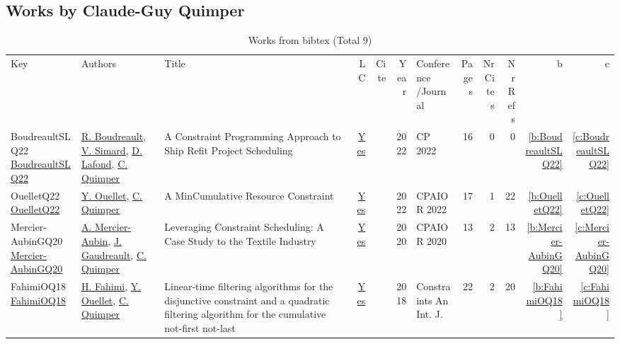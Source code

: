 \subsection{Works by Claude{-}Guy Quimper}
\label{sec:a37}
{\scriptsize
\begin{longtable}{>{\raggedright\arraybackslash}p{3cm}>{\raggedright\arraybackslash}p{6cm}>{\raggedright\arraybackslash}p{6.5cm}rrrp{2.5cm}rrrrr}
\rowcolor{white}\caption{Works from bibtex (Total 9)}\\ \toprule
\rowcolor{white}Key & Authors & Title & LC & Cite & Year & \shortstack{Conference\\/Journal} & Pages & \shortstack{Nr\\Cites} & \shortstack{Nr\\Refs} & b & c \\ \midrule\endhead
\bottomrule
\endfoot
BoudreaultSLQ22 \href{https://doi.org/10.4230/LIPIcs.CP.2022.10}{BoudreaultSLQ22} & \hyperref[auth:a34]{R. Boudreault}, \hyperref[auth:a35]{V. Simard}, \hyperref[auth:a36]{D. Lafond}, \hyperref[auth:a37]{C. Quimper} & A Constraint Programming Approach to Ship Refit Project Scheduling & \href{works/BoudreaultSLQ22.pdf}{Yes} & \cite{BoudreaultSLQ22} & 2022 & CP 2022 & 16 & 0 & 0 & \ref{b:BoudreaultSLQ22} & \ref{c:BoudreaultSLQ22}\\
OuelletQ22 \href{https://doi.org/10.1007/978-3-031-08011-1\_21}{OuelletQ22} & \hyperref[auth:a52]{Y. Ouellet}, \hyperref[auth:a37]{C. Quimper} & A MinCumulative Resource Constraint & \href{works/OuelletQ22.pdf}{Yes} & \cite{OuelletQ22} & 2022 & CPAIOR 2022 & 17 & 1 & 22 & \ref{b:OuelletQ22} & \ref{c:OuelletQ22}\\
Mercier-AubinGQ20 \href{https://doi.org/10.1007/978-3-030-58942-4\_22}{Mercier-AubinGQ20} & \hyperref[auth:a86]{A. Mercier{-}Aubin}, \hyperref[auth:a87]{J. Gaudreault}, \hyperref[auth:a37]{C. Quimper} & Leveraging Constraint Scheduling: {A} Case Study to the Textile Industry & \href{works/Mercier-AubinGQ20.pdf}{Yes} & \cite{Mercier-AubinGQ20} & 2020 & CPAIOR 2020 & 13 & 2 & 13 & \ref{b:Mercier-AubinGQ20} & \ref{c:Mercier-AubinGQ20}\\
FahimiOQ18 \href{https://doi.org/10.1007/s10601-018-9282-9}{FahimiOQ18} & \hyperref[auth:a122]{H. Fahimi}, \hyperref[auth:a52]{Y. Ouellet}, \hyperref[auth:a37]{C. Quimper} & Linear-time filtering algorithms for the disjunctive constraint and a quadratic filtering algorithm for the cumulative not-first not-last & \href{works/FahimiOQ18.pdf}{Yes} & \cite{FahimiOQ18} & 2018 & Constraints An Int. J. & 22 & 2 & 20 & \ref{b:FahimiOQ18} & \ref{c:FahimiOQ18}\\

\end{longtable}}
